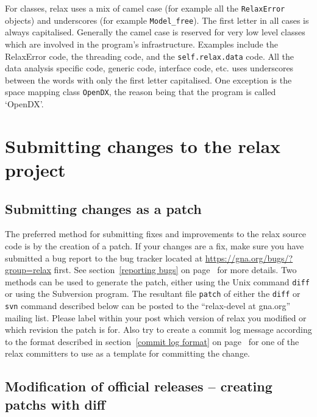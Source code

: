 For classes, relax uses a mix of camel case (for example all the \texttt{RelaxError} objects) and underscores (for example \texttt{Model\_free}).  The first letter in all cases is always capitalised.  Generally the camel case is reserved for very low level classes which are involved in the program's infrastructure.  Examples include the RelaxError code, the threading code, and the \texttt{self.relax.data} code.  All the data analysis specific code, generic code, interface code, etc. uses underscores between the words with only the first letter capitalised.  One exception is the space mapping class \texttt{OpenDX}, the reason being that the program is called `OpenDX'.




\section{Submitting changes to the relax project}


\subsection{Submitting changes as a patch}

The preferred method for submitting fixes and improvements to the relax source code is by the creation of a patch.  If your changes are a fix, make sure you have submitted a bug report to the bug tracker located at \href{https://gna.org/bugs/?group=relax}{https://gna.org/bugs/?group=relax} first.  See section~\ref{reporting bugs} on page~\pageref{reporting bugs} for more details.  Two methods can be used to generate the patch, either using the Unix command \texttt{diff} or using the Subversion program.  The resultant file \texttt{patch} of either the \texttt{diff} or \texttt{svn} command described below can be posted to the ``relax-devel at gna.org'' mailing list.  Please label within your post which version of relax you modified or which revision the patch is for.  Also try to create a commit log message according to the format described in section~\ref{commit log format} on page~\pageref{commit log format} for one of the relax committers to use as a template for committing the change.


\subsection{Modification of official releases -- creating patchs with diff}

